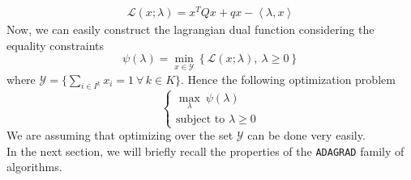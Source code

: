 \documentclass[notitlepage]{article}
\begin{document}
\begin{align*}
  \mathcal{L}(x;\lambda) = x^T Q x + q x - \left\langle \lambda,x \right\rangle 
\end{align*}
Now, we can easily construct the lagrangian dual function considering the equality constraints
\[
  \psi(\lambda) = \min_{x \in \mathcal{Y}} \left\lbrace \mathcal{L}(x;\lambda) ,\ \lambda \ge 0 \right\rbrace
\]
where $\mathcal{Y} = \{\sum_{i \in I^k} x_i = 1 \ \forall\, k \in K\}$. Hence the following optimization problem
\begin{equation}
  \begin{cases}
    \max_{\lambda}\  \psi(\lambda)  \\
    \text{subject to } \lambda \ge 0 
  \end{cases}
  \label{eqn:dual_problem}  
  \tag{$D$}
\end{equation}
We are assuming that optimizing over the set $\mathcal{Y}$ can be done very easily.\\ 
In the next section, we will briefly recall the properties of the \texttt{ADAGRAD} family of algorithms\cite{JMLR:v12:duchi11a}.%

\end{document}
